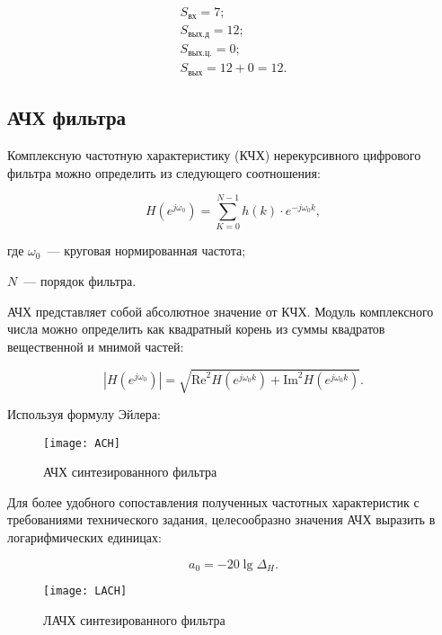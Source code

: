 \begin{gather*}
  S_{\text{вх}} = 7;\\
  S_{\text{вых.д}} = 12;\\
  S_{\text{вых.ц.}} = 0;\\
  S_{\text{вых}} = 12 + 0 = 12.
\end{gather*}

\subsection{АЧХ фильтра}

Комплексную частотную характеристику (КЧХ) нерекурсивного цифрового
фильтра можно определить из следующего соотношения:

\begin{equation*}
  H(e^{j\omega_0}) = \sum_{K=0}^{N-1}h(k) \cdot e^{-j\omega_0k},
\end{equation*}

\begin{ESKDexplanation}
\item[где ] $\omega_0$~--- круговая нормированная частота;
\item $N$~--- порядок фильтра.
\end{ESKDexplanation}

АЧХ представляет собой абсолютное значение от КЧХ. Модуль комплексного
числа можно определить как квадратный корень из суммы квадратов
вещественной и мнимой частей:

\begin{equation*}
\left|H(e^{j\omega_0}) \right| = \sqrt{\text{Re}^2H(e^{j\omega_0k}) + \text{Im}^2H(e^{j\omega_0k})}.
\end{equation*}

Используя формулу Эйлера:

\begin{figure}[h!]
  \label{f:1}
  \texttt{[image: ACH]}
  \caption{АЧХ синтезированного фильтра}
\end{figure}

Для более удобного сопоставления полученных частотных характеристик с
требованиями технического задания, целесообразно значения АЧХ выразить
в логарифмических единицах:

\begin{equation*}
  a_0 = -20 \lg \Delta_H.
\end{equation*}

\begin{figure}[h!]
  \label{f:2}
  \texttt{[image: LACH]}
  \caption{ЛАЧХ синтезированного фильтра}
\end{figure}
\newpage


